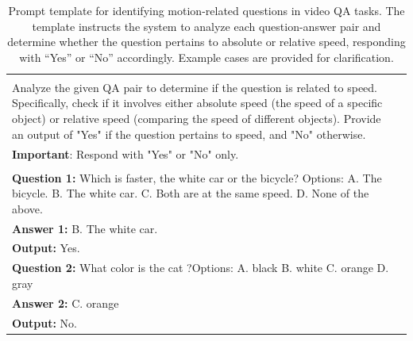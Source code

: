 \begin{table}[t!]\centering
\caption{Prompt template for identifying motion-related questions in video QA tasks. The template instructs the system to analyze each question-answer pair and determine whether the question pertains to absolute or relative speed, responding with ``Yes'' or ``No'' accordingly. Example cases are provided for clarification.}
\label{tab:temporal_grounding_prompt_v1}\vspace{2mm}
\begin{minipage}{\linewidth}
\centering
\begin{tcolorbox} 
\centering
\footnotesize
\begin{tabular}{p{} c}
\normalsize\color{blue}{\textbf{Task:}} &\\
Analyze the given QA pair to determine if the question is related to speed. Specifically, check if it involves either absolute speed (the speed of a specific object) or relative speed (comparing the speed of different objects). Provide an output of "Yes" if the question pertains to speed, and "No" otherwise. & \\
\textbf{Important}: Respond with "Yes" or "No" only.  & \\
\midrule
\normalsize\color{blue}{\textbf{Example:}} & \\
\textbf{Question 1:} Which is faster, the white car or the bicycle? Options: 
A. The bicycle. 
B. The white car. 
C. Both are at the same speed. 
D. None of the above. \\
\textbf{Answer 1:} B. The white car. \\
\textbf{Output:} Yes. \\
\textbf{Question 2:} What color is the cat ?Options: 
A. black 
B. white 
C. orange 
D. gray  \\
\textbf{Answer 2:} C. orange  \\
\textbf{Output:} No. \\
    \end{tabular}
\end{tcolorbox}
\vspace{-2mm}
\end{minipage}
\end{table}

